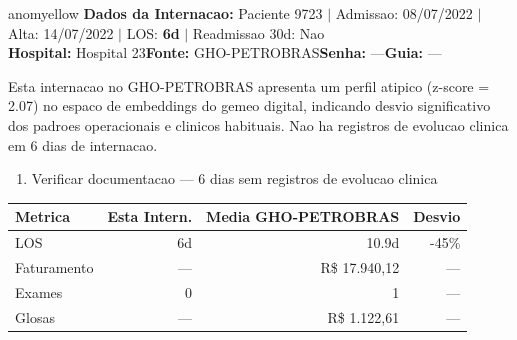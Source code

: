 \documentclass[a4paper,10pt]{article}
\begin{document}
\begin{anomalycard}[Internacao 10008 | GHO-PETROBRAS | MODERADO (z=2.07)]{anomyellow}
\textbf{Dados da Internacao:} Paciente 9723 $\mid$ Admissao: 08/07/2022 $\mid$ Alta: 14/07/2022 $\mid$ LOS: \textbf{6d} $\mid$ Readmissao 30d: Nao\\
\textbf{Hospital:} Hospital 23\quad\textbf{Fonte:} GHO-PETROBRAS\quad\textbf{Senha:} ---\quad\textbf{Guia:} ---\\
\vspace{2pt}\begin{tcolorbox}[colback=severityred!20,colframe=anomyellow,title={\textbf{Interpretacao de Negocio}},fonttitle=\bfseries\small,left=4pt,right=4pt,top=3pt,bottom=3pt]
{\small Esta internacao no GHO-PETROBRAS apresenta um perfil atipico (z-score = 2.07) no espaco de embeddings do gemeo digital, indicando desvio significativo dos padroes operacionais e clinicos habituais. Nao ha registros de evolucao clinica em 6 dias de internacao.}
\end{tcolorbox}
\begin{tcolorbox}[colback=severityyellow!30,colframe=anomorange,title={\textbf{Recomendacoes Especificas}},fonttitle=\bfseries\small,left=4pt,right=4pt,top=3pt,bottom=3pt]
\begin{enumerate}[nosep,leftmargin=16pt]
\item {\small Verificar documentacao --- 6 dias sem registros de evolucao clinica}
\end{enumerate}
\end{tcolorbox}
\begin{center}\begin{tabular}{l r r r}\toprule\textbf{Metrica} & \textbf{Esta Intern.} & \textbf{Media GHO-PETROBRAS} & \textbf{Desvio} \\\midrule
LOS & 6d & 10.9d & -45\% \\
Faturamento & --- & R\$ 17.940,12 & --- \\
Exames & 0 & 1 & --- \\
Glosas & --- & R\$ 1.122,61 & --- \\
\bottomrule\end{tabular}\end{center}


\end{anomalycard}
\end{document}
